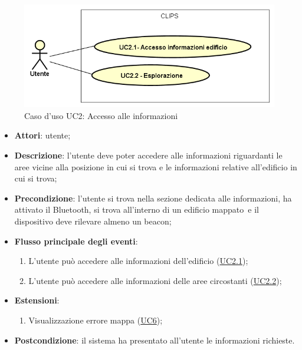 \documentclass[../AnalisiDeiRequisiti.tex]{subfiles}
\begin{document}
        \begin{figure}[!h]
            \centering
            \includegraphics[scale=0.95, width=\textwidth]{img/UC2.png}
            \caption{Caso d'uso UC2: Accesso alle informazioni}\label{fig:UC2} 
        \end{figure}
\begin{itemize}
\item \textbf{Attori}: utente;
\item \textbf{Descrizione}: l'utente deve poter accedere alle informazioni riguardanti le aree vicine alla posizione in cui si trova e le informazioni relative all'edificio in cui si trova; 
      \item \textbf{Precondizione}: l'utente si trova nella sezione dedicata alle informazioni, ha attivato il Bluetooth\g, si trova all'interno di un edificio mappato\g\ e il dispositivo deve rilevare almeno un beacon\g;

        \item \textbf{Flusso principale degli eventi}:
          \begin{enumerate}
          \item L'utente può accedere alle informazioni dell'edificio (\hyperlink{UC2.1}{UC2.1});
          \item L'utente può accedere alle informazioni delle aree circostanti (\hyperlink{UC2.2}{UC2.2});

      \end{enumerate}
    \item \textbf{Estensioni}:
      \begin{enumerate}
          \item Visualizzazione errore mappa (\hyperlink{UC6}{UC6});

      \end{enumerate}
    \item \textbf{Postcondizione}: il sistema ha presentato all'utente le informazioni richieste.
  \end{itemize}
\hypertarget{UC2.1}{}
\end{document}
